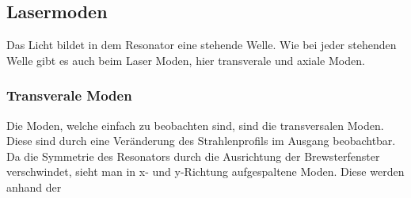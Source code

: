 
\subsection{Lasermoden}

Das Licht bildet in dem Resonator eine stehende Welle. Wie bei jeder stehenden Welle gibt es 
auch beim Laser Moden, hier transverale und axiale Moden.

\subsubsection{Transverale Moden}
Die Moden, welche einfach zu beobachten sind, sind die transversalen Moden. Diese sind durch eine Veränderung des
Strahlenprofils im Ausgang beobachtbar. Da die Symmetrie des Resonators durch die 
Ausrichtung der Brewsterfenster verschwindet, sieht man in x- und y-Richtung aufgespaltene Moden. Diese werden anhand der 
